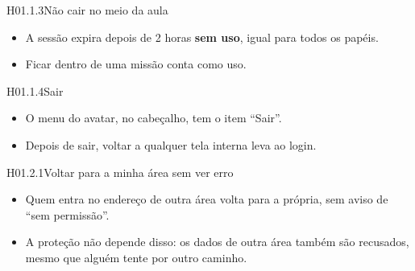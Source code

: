 \begin{historia}{H01.1.3}{Não cair no meio da aula}{\pronto}
\aceite
\begin{itemize}
  \item A sessão expira depois de 2 horas \textbf{sem uso}, igual para todos os
    papéis.
  \item Ficar dentro de uma missão conta como uso.
\end{itemize}
\end{historia}

\begin{historia}{H01.1.4}{Sair}{\pronto}
\aceite
\begin{itemize}
  \item O menu do avatar, no cabeçalho, tem o item \enquote{Sair}.
  \item Depois de sair, voltar a qualquer tela interna leva ao login.
\end{itemize}
\end{historia}


\begin{historia}{H01.2.1}{Voltar para a minha área sem ver erro}{\pronto}
\aceite
\begin{itemize}
  \item Quem entra no endereço de outra área volta para a própria, sem aviso de
    \enquote{sem permissão}.
  \item A proteção não depende disso: os dados de outra área também são
    recusados, mesmo que alguém tente por outro caminho.
\end{itemize}
\end{historia}

